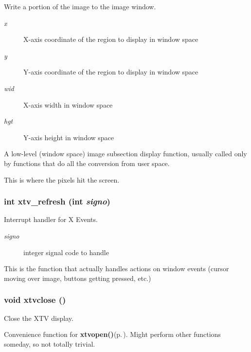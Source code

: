 Write a portion of the image to the image window. 

\begin{Desc}
\item[Parameters:]
\begin{description}
\item[{\em x}]X-axis coordinate of the region to display in window space \item[{\em y}]Y-axis coordinate of the region to display in window space \item[{\em wid}]X-axis width in window space \item[{\em hgt}]Y-axis height in window space\end{description}
\end{Desc}
A low-level (window space) image subsection display function, usually called only by functions that do all the conversion from user space.

This is where the pixels hit the screen. 
\subsubsection{\setlength{\rightskip}{0pt plus 5cm}int xtv\_\-refresh (int {\em signo})}\label{xtv_8h_a117}


Interrupt handler for X Events. 

\begin{Desc}
\item[Parameters:]
\begin{description}
\item[{\em signo}]integer signal code to handle\end{description}
\end{Desc}
This is the function that actually handles actions on window events (cursor moving over image, buttons getting pressed, etc.) 
\subsubsection{\setlength{\rightskip}{0pt plus 5cm}void xtvclose ()}\label{xtv_8h_a127}


Close the XTV display. 

Convenience function for {\bf xtvopen()}{\rm (p.\,\pageref{xtv_8c_a3})}. Might perform other functions someday, so not totally trivial. 
